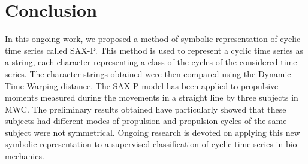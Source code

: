 \section{Conclusion}
In this ongoing work, we proposed a method of symbolic representation of cyclic time series called SAX-P.
This method is used to represent a cyclic time series as a string, each character representing a
class of the cycles of the considered time series. The character strings
obtained were then compared using the Dynamic Time Warping distance.
 The SAX-P model has been applied to propulsive moments measured during the movements in a straight
 line by three subjects in MWC. The preliminary results obtained have particularly showed that these
 subjects had different modes of propulsion and propulsion cycles of the same subject were not 
 symmetrical. Ongoing research is devoted on applying this new symbolic representation to a 
 supervised classification of cyclic time-series in bio-mechanics.
 
